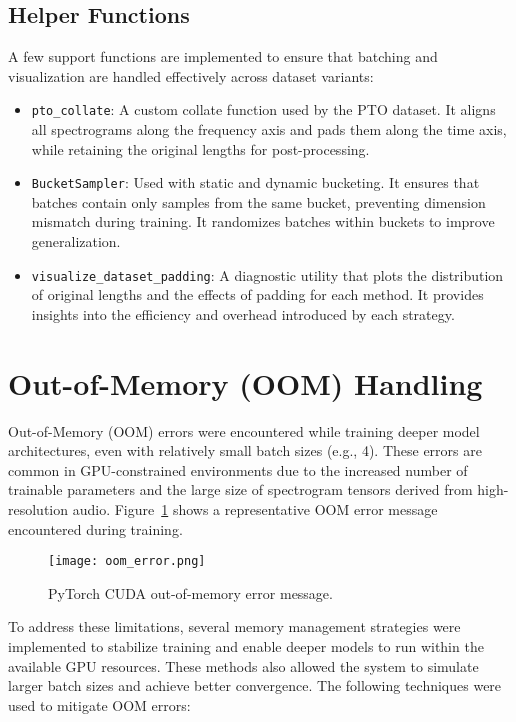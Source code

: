 \subsection{Helper Functions}
\label{subsec:helper_functions}

A few support functions are implemented to ensure that batching and visualization are handled effectively across dataset variants:

\begin{itemize}
    \item \texttt{pto\_collate}: A custom collate function used by the PTO dataset. It aligns all spectrograms along the frequency axis and pads them along the time axis, while retaining the original lengths for post-processing.
    \item \texttt{BucketSampler}: Used with static and dynamic bucketing. It ensures that batches contain only samples from the same bucket, preventing dimension mismatch during training. It randomizes batches within buckets to improve generalization.
    \item \texttt{visualize\_dataset\_padding}: A diagnostic utility that plots the distribution of original lengths and the effects of padding for each method. It provides insights into the efficiency and overhead introduced by each strategy.
\end{itemize}


\section{Out-of-Memory (OOM) Handling}
\label{sec:oom_handling}

Out-of-Memory (OOM) errors were encountered while training deeper model architectures, even with relatively small batch sizes (e.g., 4). These errors are common in GPU-constrained environments due to the increased number of trainable parameters and the large size of spectrogram tensors derived from high-resolution audio. Figure~\ref{fig:oom_error} shows a representative OOM error message encountered during training.

\begin{figure}[H]
    \centering
    \texttt{[image: oom\_error.png]}
    \caption{\label{fig:oom_error} PyTorch CUDA out-of-memory error message.}
\end{figure}

To address these limitations, several memory management strategies were implemented to stabilize training and enable deeper models to run within the available GPU resources. These methods also allowed the system to simulate larger batch sizes and achieve better convergence. The following techniques were used to mitigate OOM errors:

